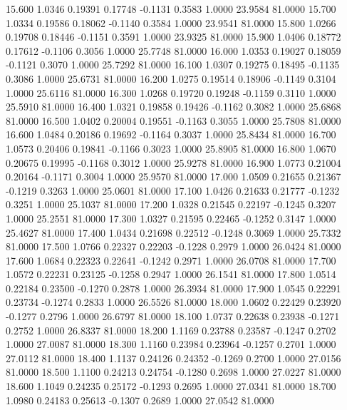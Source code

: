   15.600   1.0346   0.19391   0.17748  -0.1131   0.3583   1.0000  23.9584  81.0000
  15.700   1.0334   0.19586   0.18062  -0.1140   0.3584   1.0000  23.9541  81.0000
  15.800   1.0266   0.19708   0.18446  -0.1151   0.3591   1.0000  23.9325  81.0000
  15.900   1.0406   0.18772   0.17612  -0.1106   0.3056   1.0000  25.7748  81.0000
  16.000   1.0353   0.19027   0.18059  -0.1121   0.3070   1.0000  25.7292  81.0000
  16.100   1.0307   0.19275   0.18495  -0.1135   0.3086   1.0000  25.6731  81.0000
  16.200   1.0275   0.19514   0.18906  -0.1149   0.3104   1.0000  25.6116  81.0000
  16.300   1.0268   0.19720   0.19248  -0.1159   0.3110   1.0000  25.5910  81.0000
  16.400   1.0321   0.19858   0.19426  -0.1162   0.3082   1.0000  25.6868  81.0000
  16.500   1.0402   0.20004   0.19551  -0.1163   0.3055   1.0000  25.7808  81.0000
  16.600   1.0484   0.20186   0.19692  -0.1164   0.3037   1.0000  25.8434  81.0000
  16.700   1.0573   0.20406   0.19841  -0.1166   0.3023   1.0000  25.8905  81.0000
  16.800   1.0670   0.20675   0.19995  -0.1168   0.3012   1.0000  25.9278  81.0000
  16.900   1.0773   0.21004   0.20164  -0.1171   0.3004   1.0000  25.9570  81.0000
  17.000   1.0509   0.21655   0.21367  -0.1219   0.3263   1.0000  25.0601  81.0000
  17.100   1.0426   0.21633   0.21777  -0.1232   0.3251   1.0000  25.1037  81.0000
  17.200   1.0328   0.21545   0.22197  -0.1245   0.3207   1.0000  25.2551  81.0000
  17.300   1.0327   0.21595   0.22465  -0.1252   0.3147   1.0000  25.4627  81.0000
  17.400   1.0434   0.21698   0.22512  -0.1248   0.3069   1.0000  25.7332  81.0000
  17.500   1.0766   0.22327   0.22203  -0.1228   0.2979   1.0000  26.0424  81.0000
  17.600   1.0684   0.22323   0.22641  -0.1242   0.2971   1.0000  26.0708  81.0000
  17.700   1.0572   0.22231   0.23125  -0.1258   0.2947   1.0000  26.1541  81.0000
  17.800   1.0514   0.22184   0.23500  -0.1270   0.2878   1.0000  26.3934  81.0000
  17.900   1.0545   0.22291   0.23734  -0.1274   0.2833   1.0000  26.5526  81.0000
  18.000   1.0602   0.22429   0.23920  -0.1277   0.2796   1.0000  26.6797  81.0000
  18.100   1.0737   0.22638   0.23938  -0.1271   0.2752   1.0000  26.8337  81.0000
  18.200   1.1169   0.23788   0.23587  -0.1247   0.2702   1.0000  27.0087  81.0000
  18.300   1.1160   0.23984   0.23964  -0.1257   0.2701   1.0000  27.0112  81.0000
  18.400   1.1137   0.24126   0.24352  -0.1269   0.2700   1.0000  27.0156  81.0000
  18.500   1.1100   0.24213   0.24754  -0.1280   0.2698   1.0000  27.0227  81.0000
  18.600   1.1049   0.24235   0.25172  -0.1293   0.2695   1.0000  27.0341  81.0000
  18.700   1.0980   0.24183   0.25613  -0.1307   0.2689   1.0000  27.0542  81.0000
